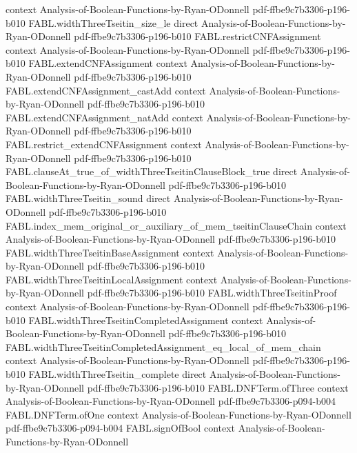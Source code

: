 \begin{theorem}
  {context}
  {Analysis-of-Boolean-Functions-by-Ryan-ODonnell}
  {pdf-ffbe9c7b3306-p196-b010}
\proofstep
  {FABL.widthThreeTseitin_size_le}
  {direct}
  {Analysis-of-Boolean-Functions-by-Ryan-ODonnell}
  {pdf-ffbe9c7b3306-p196-b010}
\proofstep
  {FABL.restrictCNFAssignment}
  {context}
  {Analysis-of-Boolean-Functions-by-Ryan-ODonnell}
  {pdf-ffbe9c7b3306-p196-b010}
\proofstep
  {FABL.extendCNFAssignment}
  {context}
  {Analysis-of-Boolean-Functions-by-Ryan-ODonnell}
  {pdf-ffbe9c7b3306-p196-b010}
\proofstep
  {FABL.extendCNFAssignment_castAdd}
  {context}
  {Analysis-of-Boolean-Functions-by-Ryan-ODonnell}
  {pdf-ffbe9c7b3306-p196-b010}
\proofstep
  {FABL.extendCNFAssignment_natAdd}
  {context}
  {Analysis-of-Boolean-Functions-by-Ryan-ODonnell}
  {pdf-ffbe9c7b3306-p196-b010}
\proofstep
  {FABL.restrict_extendCNFAssignment}
  {context}
  {Analysis-of-Boolean-Functions-by-Ryan-ODonnell}
  {pdf-ffbe9c7b3306-p196-b010}
\proofstep
  {FABL.clauseAt_true_of_widthThreeTseitinClauseBlock_true}
  {direct}
  {Analysis-of-Boolean-Functions-by-Ryan-ODonnell}
  {pdf-ffbe9c7b3306-p196-b010}
\proofstep
  {FABL.widthThreeTseitin_sound}
  {direct}
  {Analysis-of-Boolean-Functions-by-Ryan-ODonnell}
  {pdf-ffbe9c7b3306-p196-b010}
\proofstep
  {FABL.index_mem_original_or_auxiliary_of_mem_tseitinClauseChain}
  {context}
  {Analysis-of-Boolean-Functions-by-Ryan-ODonnell}
  {pdf-ffbe9c7b3306-p196-b010}
\proofstep
  {FABL.widthThreeTseitinBaseAssignment}
  {context}
  {Analysis-of-Boolean-Functions-by-Ryan-ODonnell}
  {pdf-ffbe9c7b3306-p196-b010}
\proofstep
  {FABL.widthThreeTseitinLocalAssignment}
  {context}
  {Analysis-of-Boolean-Functions-by-Ryan-ODonnell}
  {pdf-ffbe9c7b3306-p196-b010}
\proofstep
  {FABL.widthThreeTseitinProof}
  {context}
  {Analysis-of-Boolean-Functions-by-Ryan-ODonnell}
  {pdf-ffbe9c7b3306-p196-b010}
\proofstep
  {FABL.widthThreeTseitinCompletedAssignment}
  {context}
  {Analysis-of-Boolean-Functions-by-Ryan-ODonnell}
  {pdf-ffbe9c7b3306-p196-b010}
\proofstep
  {FABL.widthThreeTseitinCompletedAssignment_eq_local_of_mem_chain}
  {context}
  {Analysis-of-Boolean-Functions-by-Ryan-ODonnell}
  {pdf-ffbe9c7b3306-p196-b010}
\proofstep
  {FABL.widthThreeTseitin_complete}
  {direct}
  {Analysis-of-Boolean-Functions-by-Ryan-ODonnell}
  {pdf-ffbe9c7b3306-p196-b010}
\proofstep
  {FABL.DNFTerm.ofThree}
  {context}
  {Analysis-of-Boolean-Functions-by-Ryan-ODonnell}
  {pdf-ffbe9c7b3306-p094-b004}
\proofstep
  {FABL.DNFTerm.ofOne}
  {context}
  {Analysis-of-Boolean-Functions-by-Ryan-ODonnell}
  {pdf-ffbe9c7b3306-p094-b004}
\proofstep
  {FABL.signOfBool}
  {context}
  {Analysis-of-Boolean-Functions-by-Ryan-ODonnell}

\end{theorem}
